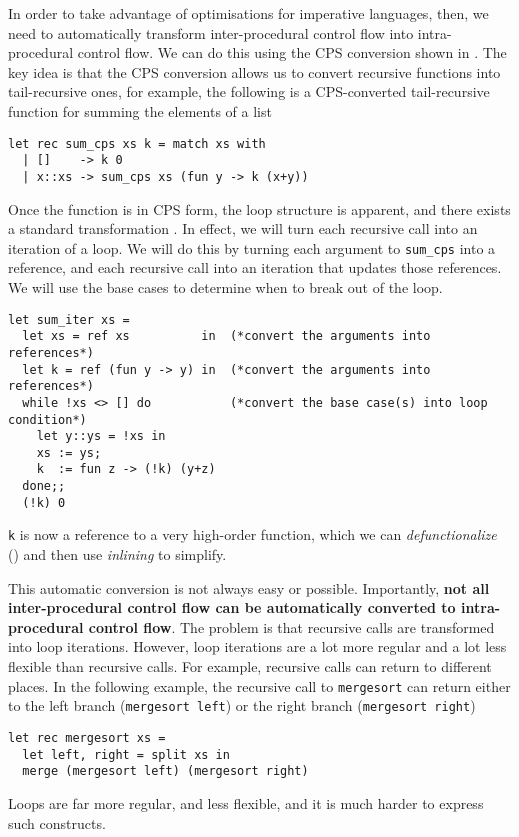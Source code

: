 In order to take advantage of optimisations for imperative languages, then, we need to automatically transform inter-procedural control flow into intra-procedural control flow. We can do this using the CPS conversion shown in . The key idea is that the CPS conversion allows us to convert recursive functions into tail-recursive ones, for example, the following is a CPS-converted tail-recursive function for summing the elements of a list
\begin{verbatim}
let rec sum_cps xs k = match xs with
  | []    -> k 0
  | x::xs -> sum_cps xs (fun y -> k (x+y))
\end{verbatim}
Once the function is in CPS form, the loop structure is apparent, and there exists a standard transformation \cite{kelsey-1995}. In effect, we will turn each recursive call into an iteration of a loop. We will do this by turning each argument to \texttt{sum\_cps} into a reference, and each recursive call into an iteration that updates those references. We will use the base cases to determine when to break out of the loop. 
\begin{verbatim}
let sum_iter xs = 
  let xs = ref xs          in  (*convert the arguments into references*)
  let k = ref (fun y -> y) in  (*convert the arguments into references*)
  while !xs <> [] do           (*convert the base case(s) into loop condition*)
    let y::ys = !xs in
    xs := ys;
    k  := fun z -> (!k) (y+z)
  done;;
  (!k) 0
\end{verbatim}
\texttt{k} is now a reference to a very high-order function, which we can \textit{defunctionalize} () and then use \textit{inlining} to simplify.

This automatic conversion is not always easy or possible. Importantly, \textbf{not all inter-procedural control flow can be automatically converted to intra-procedural control flow}. The problem is that recursive calls are transformed into loop iterations. However, loop iterations are a lot more regular and a lot less flexible than recursive calls. For example, recursive calls can return to different places. In the following example, the recursive call to \texttt{mergesort} can return either to the left branch (\texttt{mergesort left}) or the right branch (\texttt{mergesort right})
\begin{verbatim}
let rec mergesort xs = 
  let left, right = split xs in
  merge (mergesort left) (mergesort right)
\end{verbatim}
Loops are far more regular, and less flexible, and it is much harder to express such constructs. 

